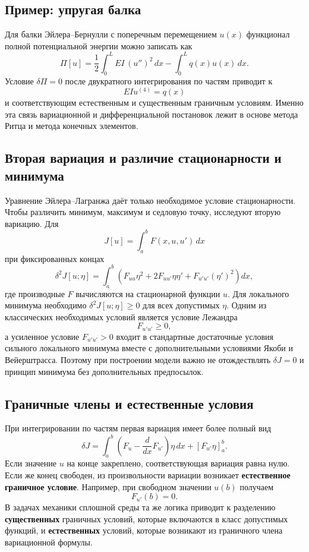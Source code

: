 \subsection{Пример: упругая балка}

Для балки Эйлера--Бернулли с поперечным перемещением $u(x)$ функционал
полной потенциальной энергии можно записать как
\[
\Pi[u]
=\frac12\int_0^L EI\,(u'')^2\,dx
-\int_0^L q(x)u(x)\,dx.
\]
Условие $\delta\Pi=0$ после двукратного интегрирования по частям приводит к
\[
EIu^{(4)}=q(x)
\]
и соответствующим естественным и существенным граничным условиям.
Именно эта связь вариационной и дифференциальной постановок лежит в
основе метода Ритца и метода конечных элементов.


\subsection{Вторая вариация и различие стационарности и минимума}

Уравнение Эйлера--Лагранжа даёт только необходимое условие стационарности.
Чтобы различить минимум, максимум и седловую точку, исследуют вторую вариацию.
Для
\[
    J[u]=\int_a^b F(x,u,u')\,dx
\]
при фиксированных концах
\[
\delta^2J[u;\eta]
=\int_a^b\left(
F_{uu}\eta^2+2F_{u u'}\eta\eta'+F_{u'u'}(\eta')^2
\right)dx,
\]
где производные $F$ вычисляются на стационарной функции $u$. Для локального
минимума необходимо $\delta^2J[u;\eta]\ge0$ для всех допустимых $\eta$.
Одним из классических необходимых условий является условие Лежандра
\[
    F_{u'u'}\ge0,
\]
а усиленное условие $F_{u'u'}>0$ входит в стандартные достаточные условия
сильного локального минимума вместе с дополнительными условиями Якоби и
Вейерштрасса. Поэтому при построении модели важно не отождествлять
\(\delta J=0\) и принцип минимума без дополнительных предпосылок.

\subsection{Граничные члены и естественные условия}

При интегрировании по частям первая вариация имеет более полный вид
\[
\delta J
=\int_a^b\left(F_u-\frac{d}{dx}F_{u'}\right)\eta\,dx
+\left[F_{u'}\eta\right]_a^b.
\]
Если значение $u$ на конце закреплено, соответствующая вариация равна нулю.
Если же конец свободен, из произвольности вариации возникает
\textbf{естественное граничное условие}. Например, при свободном значении
$u(b)$ получаем
\[
    F_{u'}(b)=0.
\]
В задачах механики сплошной среды та же логика приводит к разделению
\textbf{существенных} граничных условий, которые включаются в класс допустимых
функций, и \textbf{естественных} условий, которые возникают из граничного члена
вариационной формулы.

